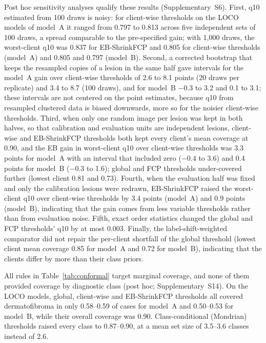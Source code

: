 \documentclass[VANCOUVER,Times1COL]{WileyNJDv5}
\begin{document}
Post hoc sensitivity analyses qualify these results (Supplementary~S6). First, q10 estimated from 100 draws
is noisy: for client-wise thresholds on the LOCO models of model~A it ranged from 0.797 to 0.813 across
five independent sets of 100 draws, a spread comparable to the pre-specified gain; with 1,000 draws, the
worst-client q10 was 0.837 for EB-ShrinkFCP and 0.805 for client-wise thresholds (model~A) and 0.805 and
0.797 (model~B). Second, a corrected bootstrap that keeps the resampled copies of a lesion in the same half
gave intervals for the model~A gain over client-wise thresholds of 2.6 to 8.1 points (20 draws per
replicate) and 3.4 to 8.7 (100 draws), and for model~B $-0.3$ to 3.2 and 0.1 to 3.1; these intervals are
not centered on the point estimates, because q10 from resampled clustered data is biased downwards, more
so for the noisier client-wise thresholds. Third, when only one random image per lesion was kept in both
halves, so that calibration and evaluation units are independent lesions, client-wise and EB-ShrinkFCP
thresholds both kept every client's mean coverage at 0.90, and the EB gain in worst-client q10 over
client-wise thresholds was 3.3 points for model~A with an interval that included zero ($-0.4$ to 3.6) and
0.4 points for model~B ($-0.3$ to 1.6); global and FCP thresholds under-covered further (lowest client
0.81 and 0.73). Fourth, when the evaluation half was fixed and only the calibration lesions were redrawn,
EB-ShrinkFCP raised the worst-client q10 over client-wise thresholds by 3.4 points (model~A) and 0.9 points
(model~B), indicating that the gain comes from less variable thresholds rather than from evaluation noise.
Fifth, exact order statistics changed the global and FCP thresholds' q10 by at most 0.003. Finally, the
label-shift-weighted comparator did not repair the per-client shortfall of the global threshold (lowest
client mean coverage 0.85 for model~A and 0.72 for model~B), indicating that the clients differ by more than
their class priors.

All rules in Table~\ref{tab:conformal} target marginal coverage, and none of them provided coverage by
diagnostic class (post hoc; Supplementary~S14). On the LOCO models, global, client-wise and EB-ShrinkFCP
thresholds all covered dermatofibroma in only 0.58--0.59 of cases for model~A and 0.50--0.53 for model~B,
while their overall coverage was 0.90. Class-conditional (Mondrian) thresholds raised every class to
0.87--0.90, at a mean set size of 3.5--3.6 classes instead of 2.6.
\end{document}
